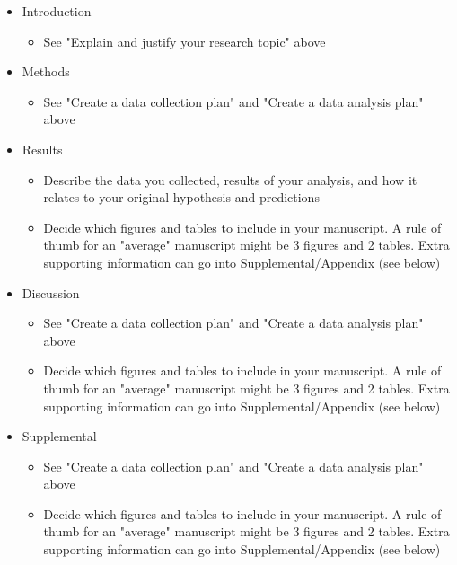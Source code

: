 \documentclass[11pt]{article}
\begin{document}
\begin{itemize}
\item Introduction
\begin{itemize}
  \item See "Explain and justify your research topic" above
\end{itemize}
\item Methods
\begin{itemize}
  \item See "Create a data collection plan" and "Create a data analysis plan" above
\end{itemize}
\item Results
\begin{itemize}
  \item Describe the data you collected, results of your analysis, and how it relates to your original hypothesis and predictions 
  \item Decide which figures and tables to include in your manuscript. A rule of thumb for an "average" manuscript might be 3 figures and 2 tables. Extra supporting information can go into Supplemental/Appendix (see below) 
\end{itemize}
\item Discussion
\begin{itemize}
  \item See "Create a data collection plan" and "Create a data analysis plan" above
  \item Decide which figures and tables to include in your manuscript. A rule of thumb for an "average" manuscript might be 3 figures and 2 tables. Extra supporting information can go into Supplemental/Appendix (see below) 
\end{itemize}
\item Supplemental
\begin{itemize}
  \item See "Create a data collection plan" and "Create a data analysis plan" above
  \item Decide which figures and tables to include in your manuscript. A rule of thumb for an "average" manuscript might be 3 figures and 2 tables. Extra supporting information can go into Supplemental/Appendix (see below) 
\end{itemize}

\end{itemize}
\end{document}
